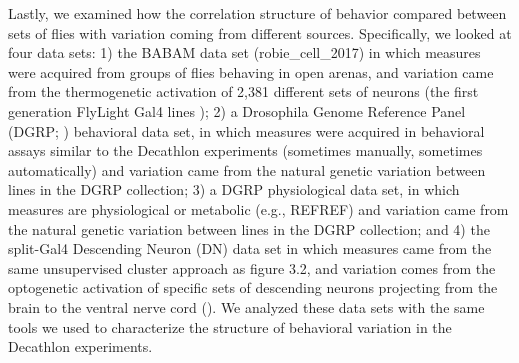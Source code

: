 \documentclass[12pt,letterpaper]{article}
\begin{document}
Lastly, we examined how the correlation structure of behavior compared between sets of flies with variation coming from different sources. Specifically, we looked at four data sets: 1) the BABAM data set (robie_cell_2017) in which measures were acquired from groups of flies behaving in open arenas, and variation came from the thermogenetic activation of 2,381 different sets of neurons (the first generation FlyLight Gal4 lines \cite{Jenett_A_2012}); 2) a Drosophila Genome Reference Panel (DGRP; \cite{Mackay_The_2012}) behavioral data set, in which measures were acquired in behavioral assays similar to the Decathlon experiments (sometimes manually, sometimes automatically) and variation came from the natural genetic variation between lines in the DGRP collection; 3) a DGRP physiological data set, in which measures are physiological or metabolic (e.g., REFREF) and variation came from the natural genetic variation between lines in the DGRP collection; and 4) the split-Gal4 Descending Neuron (DN) data set \cite{Cande_Optogenetic_2018} in which measures came from the same unsupervised cluster approach as figure 3.2, and variation comes from the optogenetic activation of specific sets of descending neurons projecting from the brain to the ventral nerve cord (\cite{Namiki_The_2018}). We analyzed these data sets with the same tools we used to characterize the structure of behavioral variation in the Decathlon experiments. 
\end{document}
